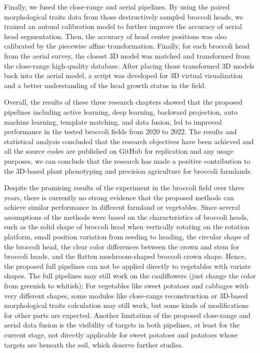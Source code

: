 Finally, we fused the close-range and aerial pipelines. By using the paired morphological traits data from those destructively sampled broccoli heads, we trained an \gls{automl} calibration model to further improve the accuracy of aerial head segmentation. Then, the accuracy of head center positions was also calibrated by the piecewise affine transformation. Finally, for each broccoli head from the aerial survey, the closest 3D model was matched and transformed from the close-range high-quality database. After placing those transformed 3D models back into the aerial model, a script was developed for 3D virtual visualization and a better understanding of the head growth status in the field.

Overall, the results of these three research chapters showed that the proposed pipelines including active learning, deep learning, backward projection, auto machine learning, template matching, and data fusion, led to improved performance in the tested broccoli fields from 2020 to 2022. The results and statistical analysis concluded that the research objectives have been achieved and all the source codes are published on GitHub for replication and any usage purposes, we can conclude that the research has made a positive contribution to the 3D-based plant phenotyping and precision agriculture for broccoli farmlands.

Despite the promising results of the experiment in the broccoli field over three years, there is currently no strong evidence that the proposed methods can achieve similar performance in different farmland or vegetables. Since several assumptions of the methods were based on the characteristics of broccoli heads, such as the solid shape of broccoli head when vertically rotating on the rotation platform, small position variation from seeding to heading, the circular shape of the broccoli head, the clear color differences between the crown and stem for broccoli heads, and the flatten mushroom-shaped broccoli crown shape. Hence, the proposed full pipelines can not be applied directly to vegetables with variate shapes. The full pipelines may still work on the cauliflowers (just change the color from greenish to whitish); For vegetables like sweet potatoes and cabbages with very different shapes, some modules like close-range reconstruction or 3D-based morphological traits calculation may still work, but some kinds of modifications for other parts are expected. Another limitation of the proposed close-range and aerial data fusion is the visibility of targets in both pipelines, at least for the current stage, not directly applicable for sweet potatoes and potatoes whose targets are beneath the soil, which deserve further studies.

